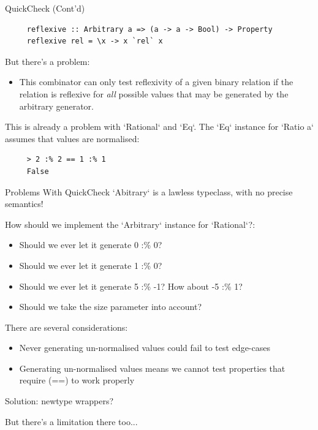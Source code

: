   \begin{frame}[fragile]{QuickCheck (Cont'd)}
     \begin{verbatim}
     reflexive :: Arbitrary a => (a -> a -> Bool) -> Property
     reflexive rel = \x -> x `rel` x 
     \end{verbatim}
     
     But there's a problem:
     \begin{itemize}
         \item This combinator can only test reflexivity of a given binary relation
               if the relation is reflexive for \textit{all} possible values that
               may be generated by the arbitrary generator.
     \end{itemize}
    
     This is already a problem with `Rational` and `Eq`. The `Eq` instance for `Ratio a`
     assumes that values are normalised:
     
     \begin{verbatim}
     > 2 :% 2 == 1 :% 1
     False
     \end{verbatim}
     
  \end{frame}

  \begin{frame}{Problems With QuickCheck}
      `Abitrary` is a lawless typeclass, with no precise semantics!
      
      How should we implement the `Arbitrary` instance for `Rational`?:
      
      \begin{itemize}
          \item Should we ever let it generate 0 :\% 0?
          \item Should we ever let it generate 1 :\% 0?
          \item Should we ever let it generate 5 :\% -1? How about -5 :\% 1?
          \item Should we take the size parameter into account?
      \end{itemize}
      
      There are several considerations:
      
      \begin{itemize}
          \item Never generating un-normalised values could fail to test edge-cases
          \item Generating un-normalised values means we cannot test properties that require (==) to work properly
      \end{itemize}
      
      Solution: newtype wrappers?
      
      But there's a limitation there too...
  \end{frame}

